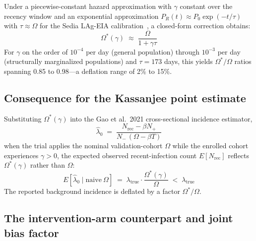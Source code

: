 \documentclass[11pt]{article}
\begin{document}
Under a piecewise-constant hazard approximation with $\gamma$ constant over the recency window and an exponential approximation $P_R(t) \approx P_0\exp(-t/\tau)$ with $\tau \approx \Omega$ for the Sedia LAg-EIA calibration~\cite{sedialag}, a closed-form correction obtains:
\begin{equation}
\Omega^*(\gamma) \;\approx\; \frac{\Omega}{1 + \gamma\tau} \label{eq:omega_closed}
\end{equation}
For $\gamma$ on the order of $10^{-4}$ per day (general population) through $10^{-3}$ per day (structurally marginalized populations) and $\tau = 173$ days, this yields $\Omega^*/\Omega$ ratios spanning 0.85 to 0.98---a deflation range of 2\% to 15\%.

\subsection{Consequence for the Kassanjee point estimate}

Substituting $\Omega^*(\gamma)$ into the Gao et al.\ 2021 cross-sectional incidence estimator,
\begin{equation}
\hat\lambda_0 \;=\; \frac{N_{\mathrm{rec}} - \beta N_+}{N_-\,(\Omega - \beta T)} \label{eq:kassanjee}
\end{equation}
when the trial applies the nominal validation-cohort $\Omega$ while the enrolled cohort experiences $\gamma > 0$, the expected observed recent-infection count $E[N_{\mathrm{rec}}]$ reflects $\Omega^*(\gamma)$ rather than $\Omega$:
\begin{equation}
E[\hat\lambda_0 \mid \mathrm{naive}\ \Omega] \;=\; \lambda_{\mathrm{true}} \cdot \frac{\Omega^*(\gamma)}{\Omega} \;<\; \lambda_{\mathrm{true}}
\end{equation}
The reported background incidence is deflated by a factor $\Omega^*/\Omega$.

\subsection{The intervention-arm counterpart and joint bias factor}
\end{document}
